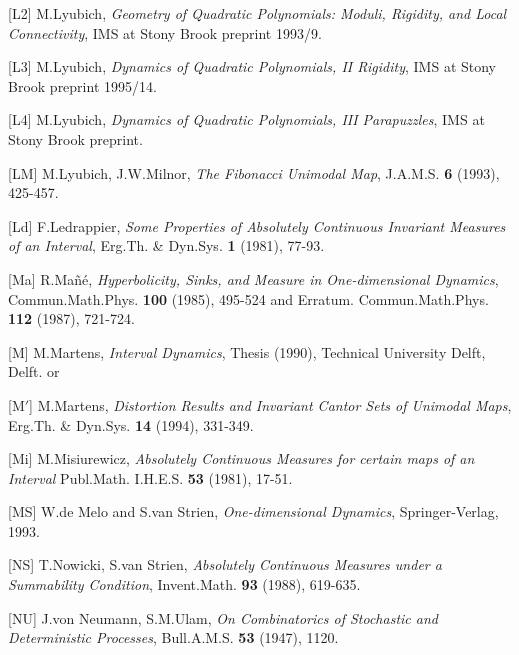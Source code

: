 \item{[L2]} M.Lyubich, {\it Geometry of Quadratic Polynomials: Moduli,
            Rigidity, and Local Connectivity},
            IMS at Stony Brook preprint 1993/9. 

\item{[L3]} M.Lyubich, {\it Dynamics of Quadratic Polynomials, II 
            Rigidity}, IMS at Stony Brook preprint 1995/14. 

\item{[L4]} M.Lyubich, {\it Dynamics of Quadratic Polynomials, III 
            Parapuzzles}, IMS at Stony Brook preprint.

\item{[LM]} M.Lyubich, J.W.Milnor, {\it The Fibonacci Unimodal Map},
            J.A.M.S. {\bf 6} (1993), 425-457.

\item{[Ld]} F.Ledrappier, {\it Some Properties of Absolutely Continuous
            Invariant Measures of an Interval}, Erg.Th. \& Dyn.Sys. 
            {\bf 1} (1981), 77-93. 

\item{[Ma]} R.Ma\~n\'e, {\it Hyperbolicity, Sinks, and Measure in 
            One-dimensional Dynamics}, Commun.Math.Phys. {\bf 100} (1985), 
            495-524 and Erratum. Commun.Math.Phys. {\bf 112} (1987), 721-724. 

\item{[M]} M.Martens, {\it Interval Dynamics}, Thesis (1990), 
            Technical University Delft, Delft. or
 
\item{[M$'$]} M.Martens, {\it Distortion Results and Invariant Cantor Sets of
           Unimodal Maps}, Erg.Th. \& Dyn.Sys. {\bf 14} (1994), 331-349.

\item{[Mi]} M.Misiurewicz, {\it Absolutely Continuous Measures for certain
            maps of an Interval}  Publ.Math. I.H.E.S. {\bf 53} (1981),
            17-51.
 
\item{[MS]} W.de Melo and S.van Strien, {\it One-dimensional Dynamics},
           Springer-Verlag, 1993.

\item{[NS]} T.Nowicki, S.van Strien, {\it Absolutely Continuous Measures under
           a Summability Condition}, Invent.Math. {\bf 93} (1988), 619-635.

\item{[NU]} J.von Neumann, S.M.Ulam, {\it On Combinatorics of Stochastic and
            Deterministic Processes}, Bull.A.M.S. {\bf 53} (1947), 1120.

